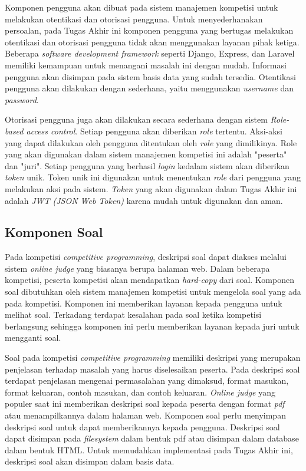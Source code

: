 \par Komponen pengguna akan dibuat pada sistem manajemen kompetisi untuk melakukan otentikasi dan otorisasi pengguna. Untuk menyederhanakan persoalan, pada Tugas Akhir ini komponen pengguna yang bertugas melakukan otentikasi dan otorisasi pengguna tidak akan menggunakan layanan pihak ketiga. Beberapa \textit{software development framework} seperti Django, Express, dan Laravel memiliki kemampuan untuk menangani masalah ini dengan mudah. Informasi pengguna akan disimpan pada sistem basis data yang sudah tersedia. Otentikasi pengguna akan dilakukan dengan sederhana, yaitu menggunakan \textit{username} dan \textit{password}.

\par Otorisasi pengguna juga akan dilakukan secara sederhana dengan sistem \textit{Role-based access control}. Setiap pengguna akan diberikan \textit{role} tertentu. Aksi-aksi yang dapat dilakukan oleh pengguna ditentukan oleh \textit{role} yang dimilikinya. Role yang akan digunakan dalam sistem manajemen kompetisi ini adalah "peserta" dan "juri". Setiap pengguna yang berhasil \textit{login} kedalam sistem akan diberikan \textit{token} unik. Token unik ini digunakan untuk menentukan \textit{role} dari pengguna yang melakukan aksi pada sistem. \textit{Token} yang akan digunakan dalam Tugas Akhir ini adalah \textit{JWT (JSON Web Token)} karena mudah untuk digunakan dan aman.

\subsection{Komponen Soal}

\par Pada kompetisi \textit{competitive programming}, deskripsi soal dapat diakses melalui sistem \textit{online judge} yang biasanya berupa halaman web. Dalam beberapa kompetisi, peserta kompetisi akan mendapatkan \textit{hard-copy} dari soal. Komponen soal dibutuhkan oleh sistem manajemen kompetisi untuk mengelola soal yang ada pada kompetisi. Komponen ini memberikan layanan kepada pengguna untuk melihat soal. Terkadang terdapat kesalahan pada soal ketika kompetisi berlangsung sehingga komponen ini perlu memberikan layanan kepada juri untuk mengganti soal.

\par Soal pada kompetisi \textit{competitive programming} memiliki deskripsi yang merupakan penjelasan terhadap masalah yang harus diselesaikan peserta. Pada deskripsi soal terdapat penjelasan mengenai permasalahan yang dimaksud, format masukan, format keluaran, contoh masukan, dan contoh keluaran. \textit{Online judge} yang populer saat ini memberikan deskripsi soal kepada peserta dengan format \textit{pdf} atau menampilkannya dalam halaman web. Komponen soal perlu menyimpan deskripsi soal untuk dapat memberikannya kepada pengguna. Deskripsi soal dapat disimpan pada \textit{filesystem} dalam bentuk pdf atau disimpan dalam database dalam bentuk HTML. Untuk memudahkan implementasi pada Tugas Akhir ini, deskripsi soal akan disimpan dalam basis data.

